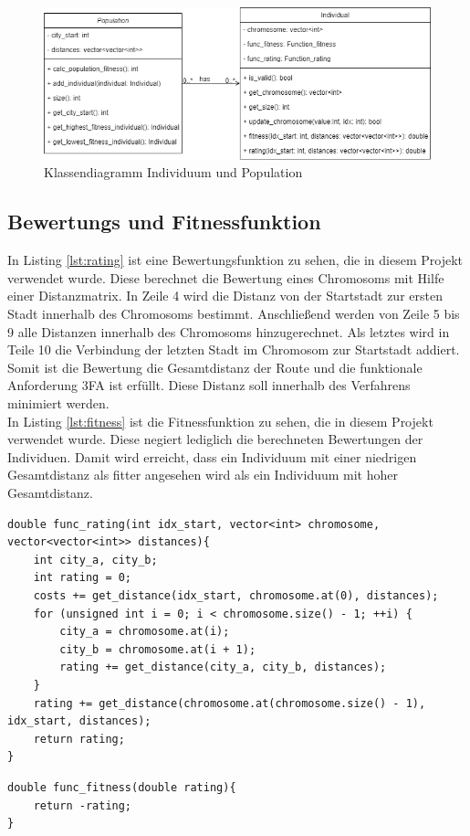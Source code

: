\begin{figure}[H]
\centering
\includegraphics[width=1\textwidth]{img/Vortrag/uml.png}
\caption{Klassendiagramm Individuum und Population}
\label{fig:klassendiagramm}
\end{figure}


\subsection{Bewertungs und Fitnessfunktion}
In Listing \ref{lst:rating} ist eine Bewertungsfunktion zu sehen, die in diesem Projekt verwendet wurde. Diese berechnet die Bewertung eines Chromosoms mit Hilfe einer Distanzmatrix. In Zeile 4 wird die Distanz von der Startstadt zur ersten Stadt innerhalb des Chromosoms bestimmt. Anschließend werden von Zeile 5 bis 9 alle Distanzen innerhalb des Chromosoms hinzugerechnet. Als letztes wird in Teile 10 die Verbindung der letzten Stadt im Chromosom zur Startstadt addiert. Somit ist die Bewertung die Gesamtdistanz der Route und die funktionale Anforderung 3FA ist erfüllt. Diese Distanz soll innerhalb des Verfahrens minimiert werden.\\
In Listing \ref{lst:fitness} ist die Fitnessfunktion zu sehen, die in diesem Projekt verwendet wurde. Diese negiert lediglich die berechneten Bewertungen der Individuen. Damit wird erreicht, dass ein Individuum mit einer niedrigen Gesamtdistanz als fitter angesehen wird als ein Individuum mit hoher Gesamtdistanz.

\begin{minipage}{\linewidth}
\begin{lstlisting}[caption={Beispiel einer Bewertungsfunktion}, firstnumber=1, captionpos=b, label=lst:rating]
double func_rating(int idx_start, vector<int> chromosome, vector<vector<int>> distances){
	int city_a, city_b;
	int rating = 0;
	costs += get_distance(idx_start, chromosome.at(0), distances);
	for (unsigned int i = 0; i < chromosome.size() - 1; ++i) {
		city_a = chromosome.at(i);
		city_b = chromosome.at(i + 1);
		rating += get_distance(city_a, city_b, distances);
	}
	rating += get_distance(chromosome.at(chromosome.size() - 1), idx_start, distances);
	return rating;
}
\end{lstlisting}
\end{minipage}
\begin{minipage}{\linewidth}
\begin{lstlisting}[caption={Beispiel einer Fitnessfunktion}, firstnumber=1, captionpos=b, label=lst:fitness]
double func_fitness(double rating){
	return -rating;
}
\end{lstlisting}
\end{minipage}
